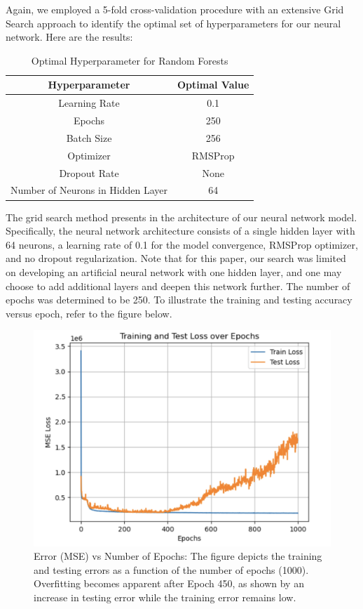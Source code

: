 \documentclass[conference]{IEEEtran}
\begin{document}
Again, we employed a 5-fold cross-validation procedure with an extensive Grid Search approach to identify the optimal set of hyperparameters for our neural network. Here are the results:

\begin{table}[H]
\centering
\caption{Optimal Hyperparameter for Random Forests}
\begin{tabular}{|c|c|}
\hline
Hyperparameter & Optimal Value \\
\hline
Learning Rate & 0.1 \\
\hline
Epochs & 250 \\
\hline
Batch Size & 256 \\
\hline
Optimizer & RMSProp \\
\hline
Dropout Rate & None \\
\hline
Number of Neurons in Hidden Layer & 64 \\
\hline
\end{tabular}
\label{tab:nn_hyper}
\end{table}

The grid search method presents in the architecture of our neural network model. Specifically, the neural network architecture consists of a single hidden layer with 64 neurons, a learning rate of 0.1 for the model convergence, RMSProp optimizer, and no dropout regularization. Note that for this paper, our search was limited on developing an artificial neural network with one hidden layer, and one may choose to add additional layers and deepen this network further. The number of epochs was determined to be 250. To illustrate the training and testing accuracy versus epoch, refer to the figure below.

\begin{figure}[H]
    \centering
    \includegraphics[width=0.8\linewidth]{1000.png} %
    \caption{Error (MSE) vs Number of Epochs: The figure depicts the training and testing errors as a function of the number of epochs (1000). Overfitting becomes apparent after Epoch 450, as shown by an increase in testing error while the training error remains low.}
    \label{fig:trn-tst-1000}
\end{figure}
\end{document}
